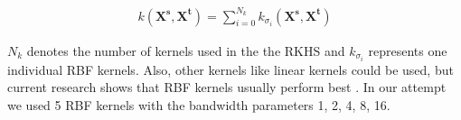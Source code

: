 \begin{align}
    k(\boldsymbol{X^{s}}, \boldsymbol{X^{t}}) = \sum_{i=0}^{N_{k}} k_{\sigma_{i}}(\boldsymbol{X^{s}}, \boldsymbol{X^{t}})
\end{align}

$N_{k}$ denotes the number of kernels used in the the RKHS and $k_{\sigma_{i}}$ represents one individual RBF kernels. Also, other kernels like linear kernels could be used, but current research shows that RBF kernels usually perform best \cite{AZAMFAR2020103932}. In our attempt we used 5 RBF kernels with the bandwidth parameters 1, 2, 4, 8, 16.


